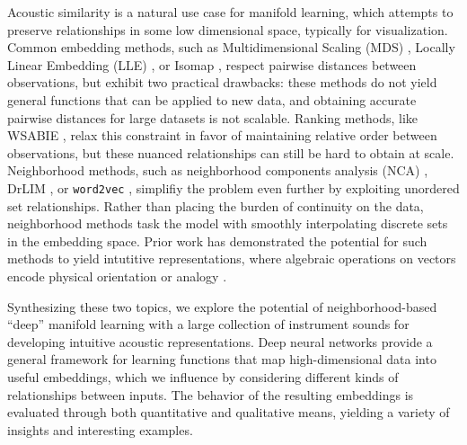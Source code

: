 \documentclass{article}
\begin{document}
Acoustic similarity is a natural use case for manifold learning, which attempts to preserve relationships in some low dimensional space, typically for visualization.
Common embedding methods, such as Multidimensional Scaling (MDS) \cite{x2000y}, Locally Linear Embedding (LLE) \cite{x2000y}, or Isomap \cite{x2000y}, respect pairwise distances between observations, but exhibit two practical drawbacks:
these methods do not yield general functions that can be applied to new data, and obtaining accurate pairwise distances for large datasets is not scalable.
Ranking methods, like WSABIE \cite{weston2011wsabie}, relax this constraint in favor of maintaining relative order between observations, but these nuanced relationships can still be hard to obtain at scale.
Neighborhood methods, such as neighborhood components analysis (NCA) \cite{hinton2004neighborhood}, DrLIM \cite{hadsell2006drlim}, or \texttt{word2vec} \cite{mikolov2013distributed}, simplifiy the problem even further by exploiting unordered set relationships. %
Rather than placing the burden of continuity on the data, neighborhood methods task the model with smoothly interpolating discrete sets in the embedding space.
Prior work has demonstrated the potential for such methods to yield intutitive representations, where algebraic operations on vectors encode physical orientation \cite{hadsell2006drlim} or analogy \cite{mikolov2013efficient}.

Synthesizing these two topics, we explore the potential of neighborhood-based ``deep'' manifold learning with a large collection of instrument sounds for developing intuitive acoustic representations.
Deep neural networks provide a general framework for learning functions that map high-dimensional data into useful embeddings, which we influence by considering different kinds of relationships between inputs.
The behavior of the resulting embeddings is evaluated through both quantitative and qualitative means, yielding a variety of insights and interesting examples.
\end{document}
